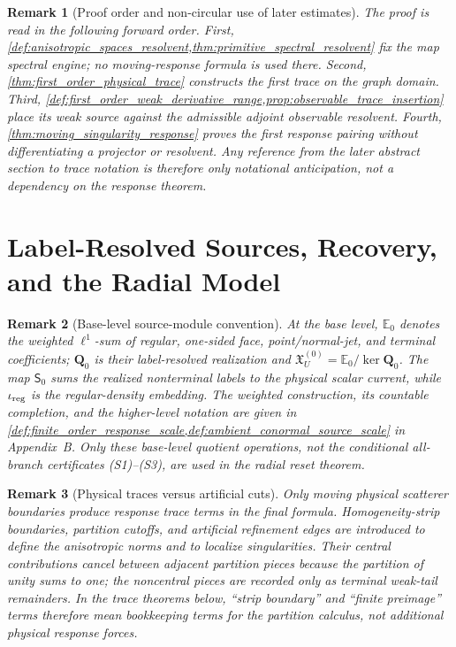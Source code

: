 \documentclass[11pt]{amsart}
\theoremstyle{compactplain}
\theoremstyle{compactdefinition}
\theoremstyle{compactremark}
\newtheorem*{remark*}{Remark}
\begin{document}
\begin{remark*}[Proof order and non-circular use of later estimates]
The proof is read in the following forward order.  First,
\cref{def:anisotropic_spaces_resolvent,thm:primitive_spectral_resolvent} fix the
map spectral engine; no moving-response formula is used there.  Second,
\cref{thm:first_order_physical_trace} constructs the first
trace on the graph domain.  Third,
\cref{def:first_order_weak_derivative_range,prop:observable_trace_insertion}
place its weak source against the admissible adjoint observable resolvent.
Fourth, \cref{thm:moving_singularity_response} proves the first response
pairing without differentiating a projector or resolvent.  Any reference
from the later abstract section to trace notation is therefore only notational
anticipation, not a dependency on the response theorem.
\end{remark*}

\section{Label-Resolved Sources, Recovery, and the Radial Model}

\begin{remark*}[Base-level source-module convention]
At the base level, \(\mathbb E_0\) denotes the weighted \(\ell^1\)-sum of
regular, one-sided face, point/normal-jet, and terminal coefficients;
\(\mathbf Q_0\) is their label-resolved realization and
\(\mathfrak X_U^{(0)}=\mathbb E_0/\ker\mathbf Q_0\).  The map
\(\mathsf S_0\) sums the realized nonterminal labels to the physical scalar
current, while \(\iota_{\rm reg}\) is the regular-density embedding.  The
weighted construction, its countable completion, and the higher-level
notation are given in
\cref{def:finite_order_response_scale,def:ambient_conormal_source_scale} in
Appendix~B.  Only these base-level quotient operations, not the conditional
all-branch certificates (S1)--(S3), are used in the radial reset theorem.
\end{remark*}

\begin{remark*}[Physical traces versus artificial cuts]
Only moving physical scatterer boundaries produce response trace terms in the
final formula.  Homogeneity-strip boundaries, partition cutoffs, and artificial
refinement edges are introduced to define the anisotropic norms and to localize
singularities.  Their central contributions cancel between adjacent partition
pieces because the partition of unity sums to one; the noncentral pieces are
recorded only as terminal weak-tail remainders.  In the trace theorems below,
``strip boundary'' and ``finite preimage'' terms therefore mean bookkeeping
terms for the partition calculus, not additional physical response forces.
\end{remark*}
\end{document}
